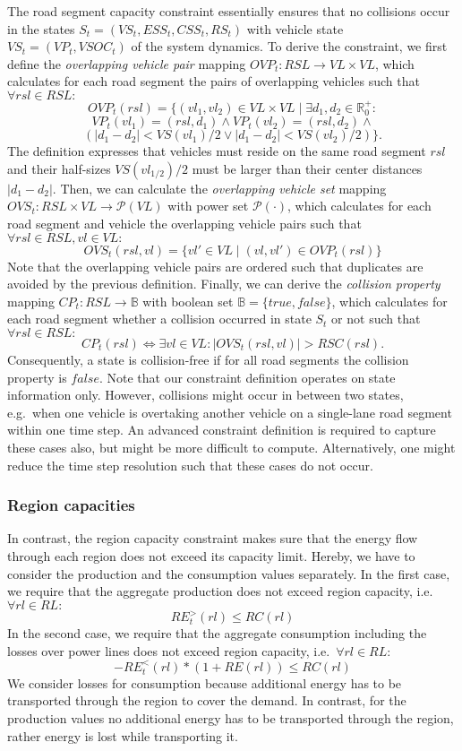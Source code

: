 The road segment capacity constraint essentially ensures that no collisions occur in the states $S_t = (VS_t, ESS_t, CSS_t, RS_t)$ with vehicle state $VS_t = (VP_t, VSOC_t)$ of the system dynamics. To derive the constraint, we first define the \textit{overlapping vehicle pair} mapping $OVP_t : RSL \rightarrow VL \times VL$, which calculates for each road segment the pairs of overlapping vehicles such that $\forall rsl \in RSL:$
\[
	OVP_t(rsl) = \{(vl_1, vl_2) \in VL \times VL \mid \exists d_1, d_2 \in \mathbb{R}_0^+:
\]
\[
	VP_t(vl_1) = (rsl, d_1) \wedge VP_t(vl_2) = (rsl, d_2) \wedge
\]
\[
	(|d_1 - d_2| < VS(vl_1) / 2 \vee |d_1 - d_2| < VS(vl_2) / 2) \} \textrm{.}
\]
The definition expresses that vehicles must reside on the same road segment $rsl$ and their half-sizes $VS(vl_{1/2}) / 2$ must be larger than their center distances $|d_1 - d_2|$. Then, we can calculate the \textit{overlapping vehicle set} mapping $OVS_t : RSL \times VL \rightarrow \mathcal{P}(VL)$ with power set $\mathcal{P}(\cdot)$, which calculates for each road segment and vehicle the overlapping vehicle pairs such that $\forall rsl \in RSL, vl \in VL:$
\[
	OVS_t(rsl,vl) = \{vl' \in VL \mid (vl, vl') \in OVP_t(rsl)\}
\]
Note that the overlapping vehicle pairs are ordered such that duplicates are avoided by the previous definition. Finally, we can derive the \textit{collision property} mapping $CP_t : RSL \rightarrow \mathbb{B}$ with boolean set $\mathbb{B} = \{true, false\}$, which calculates for each road segment whether a collision occurred in state $S_t$ or not such that $\forall rsl \in RSL:$
\[
	CP_t(rsl) \Leftrightarrow \exists vl \in VL : |OVS_t(rsl, vl)| > RSC(rsl) \textrm{.}
\]
Consequently, a state is collision-free if for all road segments the collision property is $false$. Note that our constraint definition operates on state information only. However, collisions might occur in between two states, e.g.\ when one vehicle is overtaking another vehicle on a single-lane road segment within one time step. An advanced constraint definition is required to capture these cases also, but might be more difficult to compute. Alternatively, one might reduce the time step resolution such that these cases do not occur.

\subsubsection{Region capacities}
\label{capacities}

In contrast, the region capacity constraint makes sure that the energy flow through each region does not exceed its capacity limit. Hereby, we have to consider the production and the consumption values separately. In the first case, we require that the aggregate production does not exceed region capacity, i.e.\ $\forall rl \in RL:$
\[
	RE_t^>(rl) \leq RC(rl)
\]
In the second case, we require that the aggregate consumption including the losses over power lines does not exceed region capacity, i.e.\ $\forall rl \in RL:$
\[
	- RE_t^<(rl) * (1 + RE(rl)) \leq RC(rl)
\]
We consider losses for consumption because additional energy has to be transported through the region to cover the demand. In contrast, for the production values no additional energy has to be transported through the region, rather energy is lost while transporting it.

